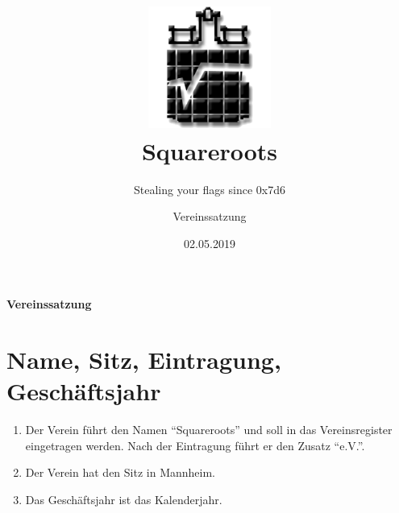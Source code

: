\documentclass[a4paper,ngerman]{scrartcl}
\begin{document}
\title{\includegraphics[width=0.3\textwidth]{sqrts}\\[1cm]Squareroots}
\subtitle{Stealing your flags since 0x7d6}
\date{02.05.2019}
\author{Vereinssatzung}

\maketitle
\pagebreak

\setcounter{tocdepth}{1}
\listoftodos
\pagebreak


\textbf{\huge{}Vereinssatzung}{\huge \par}

\section{Name, Sitz, Eintragung, Geschäftsjahr}
\begin{enumerate}
\item Der Verein führt den Namen "`Squareroots"' und soll in das Vereinsregister eingetragen werden. Nach der Eintragung führt er den Zusatz "`e.V."'.
\item Der Verein hat den Sitz in Mannheim.
\item Das Geschäftsjahr ist das Kalenderjahr.
\end{enumerate}
\end{document}
